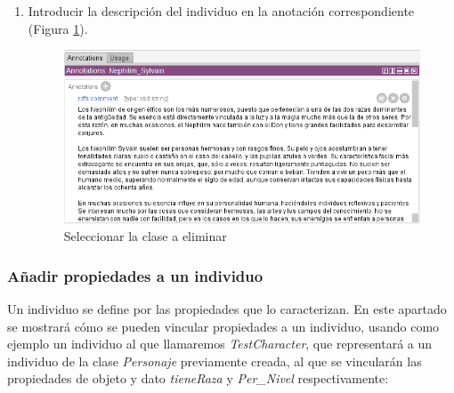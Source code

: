 \begin{enumerate}
    \item Introducir la descripción del individuo en la anotación correspondiente (Figura \ref*{CreateIndividual_4}).
    \begin{figure}[H]
        \centering
        \includegraphics[scale=0.6]{Figures/Protege/CreateIndividual_4.png}
        \caption{Seleccionar la clase a eliminar}
        \label{CreateIndividual_4}
    \end{figure}
\end{enumerate}

\subsubsection{Añadir propiedades a un individuo}
Un individuo se define por las propiedades que lo caracterizan. En este apartado se mostrará cómo se pueden vincular propiedades 
a un individuo, usando como ejemplo un individuo al que llamaremos \textit{TestCharacter}, que representará a un individuo 
de la clase \textit{Personaje} previamente creada, al que se vincularán las propiedades de objeto y dato \textit{tieneRaza} y 
\textit{Per\_Nivel} respectivamente:

